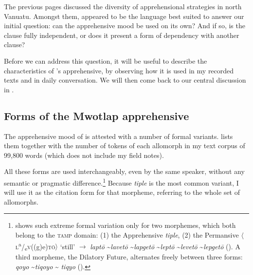 \documentclass[output=paper,colorlinks,citecolor=brown]{langscibook}
\begin{document}
The previous pages discussed the diversity of apprehensional strategies in north Vanuatu. Amongst them,  appeared to be the language best suited to answer our initial question: can the apprehensive mood be used on its own? And if so, is the clause fully independent, or does it present a form of dependency with another clause?

Before we can address this question, it will be useful to describe the characteristics of 's apprehensive, by observing how it is used in my recorded texts and in daily conversation. We will then come back to our central discussion in .
 

\subsection{Forms of the Mwotlap apprehensive}
\label{subsec:formsmwotlap}

 
The apprehensive mood of  is attested with a number of formal variants.  lists them together with the number of tokens of each allomorph in my text corpus of 99,800 words (which does not include my field notes). 
 

\begin{table}

\caption{Free variants of the apprehensive mood marker in Mwotlap}
\label{tab:moodmarkerinM}
\end{table}

All these forms are used interchangeably, even by the same speaker, without any semantic or pragmatic difference.\footnote{ shows such extreme formal variation only for two morphemes, which both belong to the \textsc{tamp} domain: (1) the Apprehensive \textit{tiple}, (2) the Permansive ${\langle}$\textsc{l}\textsuperscript{a}/\textsubscript{e}\textsc{v}((g)e)\textsc{tō}${\rangle}$ `still' $\rightarrow$ \textit{laptō} \textasciitilde \textit{lavetō} \textasciitilde \textit{lapgetō} \textasciitilde \textit{leptō} \textasciitilde \textit{levetō} \textasciitilde \textit{lepgetō} (\citealt[130]{francois2003}). A third morpheme, the Dilatory Future, alternates freely between three forms: \textit{qoyo} \textasciitilde \textit{tiqoyo} {\textasciitilde} \textit{tiqyo} (\citealt[38]{francois2003}).} Because \textit{tiple} is the most common variant, I will use it as the citation form for that morpheme, referring to the whole set of allomorphs. 
\end{document}
